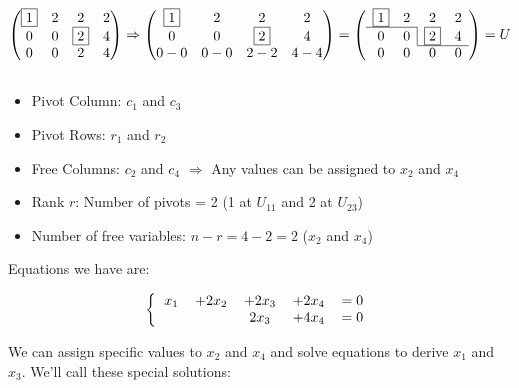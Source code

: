\documentclass[12pt]{article}
\begin{document}
\[
\left(
    \begin{matrix}
        \boxed{1} & 2 & 2 & 2\\ 
        0 & 0 & \boxed{2} & 4\\
        0 & 0 & 2 & 4\\
    \end{matrix}
\right)
\Rightarrow
\left(
    \begin{matrix}
        \boxed{1} & 2 & 2 & 2\\ 
        0 & 0 & \boxed{2} & 4\\
        0-0 & 0-0 & 2-2 & 4-4\\
    \end{matrix}
\right)
=
\left(
    \begin{array}{*{4}{c}}
        \boxed{1} & 2 & 2 & 2\\
        \cline{1-2}
        0 & \multicolumn{1}{c|}{0} & \boxed{2} & 4\\
        \cline{3-4}
        0 & 0 & 0 & 0\\
    \end{array}
\right)
=U
\]

$\>$

\begin{itemize}
    \item Pivot Column: $c_1$ and $c_3$
    \item Pivot Rows: $r_1$ and $r_2$
    \item Free Columns: $c_2$ and $c_4$ $\Rightarrow$ Any values can be assigned to $x_2$ and $x_4$
    \item Rank $r$: Number of pivots = 2 (1 at $U_{11}$ and 2 at $U_{23}$)
    \item Number of free variables: $n-r=4-2=2$ ($x_2$ and $x_4$)
\end{itemize}

Equations we have are:

\[ 
\left \{
  \begin{tabular}{ccccc}
  $x_1$ & $+2x_2$ & $+2x_3$ & $+2x_4$ & $=0$\\
  & & $2x_3$ & $+4x_4$ & $=0$\\
  \end{tabular}
\right
.\]

We can assign specific values to $x_2$ and $x_4$ and solve equations to derive $x_1$ and $x_3$. We'll call these special solutions:
\end{document}
